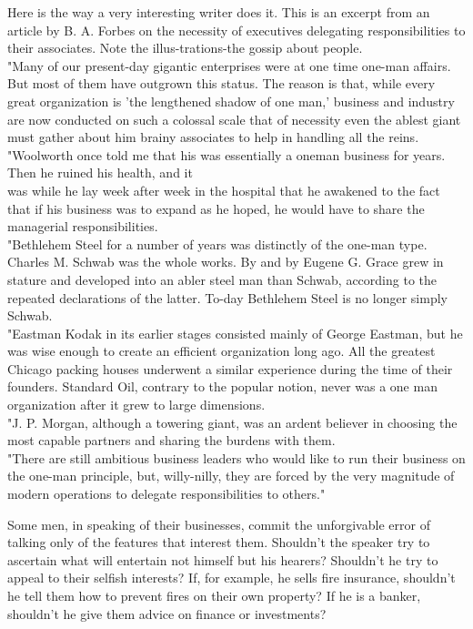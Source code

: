 \documentclass[10pt]{article}
\begin{document}
Here is the way a very interesting writer does it. This is an excerpt from an article by B. A. Forbes on the necessity of executives delegating responsibilities to their associates. Note the illus-trations-the gossip about people.\\
"Many of our present-day gigantic enterprises were at one time one-man affairs. But most of them have outgrown this status. The reason is that, while every great organization is 'the lengthened shadow of one man,' business and industry are now conducted on such a colossal scale that of necessity even the ablest giant must gather about him brainy associates to help in handling all the reins.\\
"Woolworth once told me that his was essentially a oneman business for years. Then he ruined his health, and it\\
was while he lay week after week in the hospital that he awakened to the fact that if his business was to expand as he hoped, he would have to share the managerial responsibilities.\\
"Bethlehem Steel for a number of years was distinctly of the one-man type. Charles M. Schwab was the whole works. By and by Eugene G. Grace grew in stature and developed into an abler steel man than Schwab, according to the repeated declarations of the latter. To-day Bethlehem Steel is no longer simply Schwab.\\
"Eastman Kodak in its earlier stages consisted mainly of George Eastman, but he was wise enough to create an efficient organization long ago. All the greatest Chicago packing houses underwent a similar experience during the time of their founders. Standard Oil, contrary to the popular notion, never was a one man organization after it grew to large dimensions.\\
"J. P. Morgan, although a towering giant, was an ardent believer in choosing the most capable partners and sharing the burdens with them.\\
"There are still ambitious business leaders who would like to run their business on the one-man principle, but, willy-nilly, they are forced by the very magnitude of modern operations to delegate responsibilities to others."

Some men, in speaking of their businesses, commit the unforgivable error of talking only of the features that interest them. Shouldn't the speaker try to ascertain what will entertain not himself but his hearers? Shouldn't he try to appeal to their selfish interests? If, for example, he sells fire insurance, shouldn't he tell them how to prevent fires on their own property? If he is a banker, shouldn't he give them advice on finance or investments?
\end{document}
